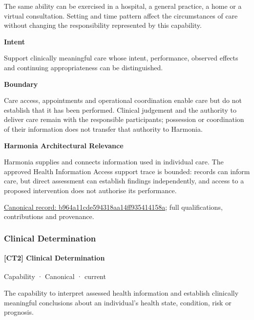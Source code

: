 The same ability can be exercised in a hospital, a general practice, a home or a virtual consultation. Setting and time pattern affect the circumstances of care without changing the responsibility represented by this capability.



\textbf{Intent}



Support clinically meaningful care whose intent, performance, observed effects and continuing appropriateness can be distinguished.



\textbf{Boundary}



Care access, appointments and operational coordination enable care but do not establish that it has been performed. Clinical judgement and the authority to deliver care remain with the responsible participants; possession or coordination of their information does not transfer that authority to Harmonia.



\textbf{Harmonia Architectural Relevance}



Harmonia supplies and connects information used in individual care. The approved Health Information Access support trace is bounded: records can inform care, but direct assessment can establish findings independently, and access to a proposed intervention does not authorise its performance.


{\footnotesize \href{../../../../continuum/strategy/capability/b964a11cde594318aa14ff935414158a.md}{Canonical record: b964a11cde594318aa14ff935414158a}; full qualifications, contributions and provenance.}\par
\subsubsection{Clinical Determination}

\paragraph{[CT2] Clinical Determination}

\label{element:39219464b6304b59bd7c3de4e237066e}
{\small Capability · Canonical · current}\par

The capability to interpret assessed health information and establish clinically meaningful conclusions about an individual's health state, condition, risk or prognosis.



